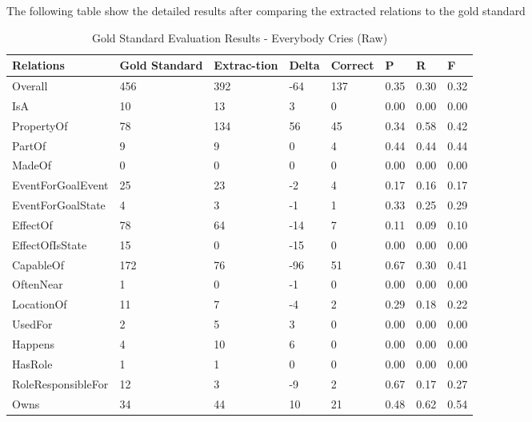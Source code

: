 %
%
%                 

\label{sec:appendixgold}

The following table show the detailed results after comparing the extracted relations to the gold standard

\begin{table}[H]   %
\centering
\caption{Gold Standard Evaluation Results - Everybody Cries (Raw)} \vspace{0.25em}
\begin{tabular}{|p{3.5cm}|p{2cm}|p{1.5cm}|p{1cm}|p{1.5cm}|p{1cm}|p{1cm}|p{1cm}|} \hline
\textbf{Relations} & \textbf{Gold Standard} & \textbf{Extrac-tion} & \textbf{Delta} & \textbf{Correct} & \textbf{P} & \textbf{R} & \textbf{F} \\ \hline
Overall & 456 & 392 & -64 & 137 & 0.35 & 0.30 & 0.32 \\ \hline
IsA & 10 & 13 & 3 & 0 & 0.00 & 0.00 & 0.00 \\ \hline
PropertyOf & 78 & 134 & 56 & 45 & 0.34 & 0.58 & 0.42 \\ \hline
PartOf  & 9 & 9 & 0 & 4 & 0.44 & 0.44 & 0.44 \\ \hline
MadeOf & 0 & 0 & 0 & 0 & 0.00 & 0.00 & 0.00 \\ \hline
EventForGoalEvent & 25 & 23 & -2 & 4 & 0.17 & 0.16 & 0.17 \\ \hline
EventForGoalState & 4 & 3 & -1 & 1 & 0.33 & 0.25 & 0.29 \\ \hline
EffectOf & 78 & 64 & -14 & 7 & 0.11 & 0.09 & 0.10 \\ \hline
EffectOfIsState & 15 & 0 & -15 & 0 & 0.00 & 0.00 & 0.00 \\ \hline
CapableOf & 172 & 76 & -96 & 51 & 0.67 & 0.30 & 0.41 \\ \hline
OftenNear & 1 & 0 & -1 & 0 & 0.00 & 0.00 & 0.00 \\ \hline
LocationOf & 11 & 7 & -4 & 2 & 0.29 & 0.18 & 0.22 \\ \hline
UsedFor & 2 & 5 & 3 & 0 & 0.00 & 0.00 & 0.00 \\ \hline
Happens & 4 & 10 & 6 & 0 & 0.00 & 0.00 & 0.00 \\ \hline
HasRole & 1 & 1 & 0 & 0 & 0.00 & 0.00 & 0.00 \\ \hline
RoleResponsibleFor & 12 & 3 & -9 & 2 & 0.67 & 0.17 & 0.27 \\ \hline
Owns & 34 & 44 & 10 & 21 & 0.48 & 0.62 & 0.54 \\ \hline
\end{tabular}
\label{tab:gold1}
\end{table}

